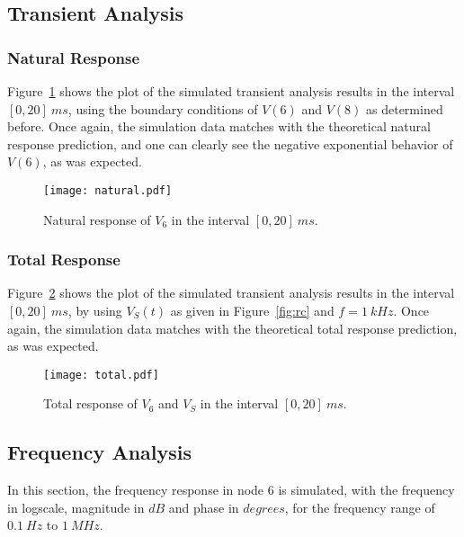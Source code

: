 \newpage
\subsection{Transient Analysis}

\subsubsection{Natural Response}

Figure~\ref{fig:trans} shows the plot of the simulated transient analysis results in the interval $[0, 20]~ms$, using the boundary conditions of $V(6)$ and $V(8)$ as determined before. 
Once again, the simulation data matches with the theoretical natural response prediction, and one can clearly see the negative exponential behavior of $V(6)$, as was expected.

\begin{figure}[h] \centering
\texttt{[image: natural.pdf]}
\caption{Natural response of $V_{6}$ in the interval $[0, 20]~ms$.}
\label{fig:trans}
\end{figure}

\newpage

\subsubsection{Total Response}

Figure~\ref{fig:totalsim} shows the plot of the simulated transient analysis results in the interval $[0, 20]~ms$, by using $V_S(t)$ as given in Figure~\ref{fig:rc} and $f = 1~kHz$. 
Once again, the simulation data matches with the theoretical total response prediction, as was expected.
                                    

\begin{figure}[h] \centering
\texttt{[image: total.pdf]}
\caption{Total response of $V_{6}$ and $V_S$ in the interval $[0, 20]~ms$.}
\label{fig:totalsim}
\end{figure}

\newpage

\subsection{Frequency Analysis}

In this section, the frequency response in node 6 is simulated, with the frequency in logscale, magnitude in $dB$ and phase in $degrees$, for the frequency range of $0.1~Hz$ to $1~MHz$.


